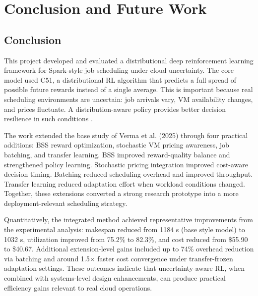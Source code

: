 \chapter{Conclusion and Future Work}
\label{chap:conclusion}

\section{Conclusion}
This project developed and evaluated a distributional deep reinforcement learning framework for Spark-style job scheduling under cloud uncertainty. The core model used C51, a distributional RL algorithm that predicts a full spread of possible future rewards instead of a single average. This is important because real scheduling environments are uncertain: job arrivals vary, VM availability changes, and prices fluctuate. A distribution-aware policy provides better decision resilience in such conditions \cite{bellemare2017distributional,sutton2018rl}.

The work extended the base study of Verma et al. (2025) through four practical additions: BSS reward optimization, stochastic VM pricing awareness, job batching, and transfer learning. BSS improved reward-quality balance and strengthened policy learning. Stochastic pricing integration improved cost-aware decision timing. Batching reduced scheduling overhead and improved throughput. Transfer learning reduced adaptation effort when workload conditions changed. Together, these extensions converted a strong research prototype into a more deployment-relevant scheduling strategy.

Quantitatively, the integrated method achieved representative improvements from the experimental analysis: makespan reduced from 1184 s (base style model) to 1032 s, utilization improved from 75.2\% to 82.3\%, and cost reduced from \$55.90 to \$40.67. Additional extension-level gains included up to 74\% overhead reduction via batching and around 1.5\(\times\) faster cost convergence under transfer-frozen adaptation settings. These outcomes indicate that uncertainty-aware RL, when combined with systems-level design enhancements, can produce practical efficiency gains relevant to real cloud operations.

